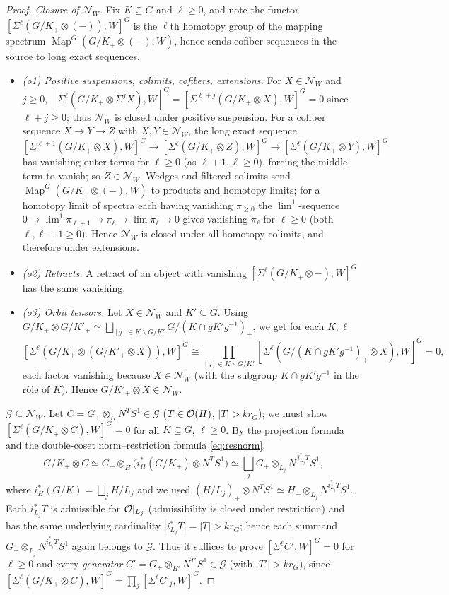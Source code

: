 \begin{proof}
\emph{Closure of $\mathcal N_W$.} Fix $K\subseteq G$ and $\ell\ge0$, and note the
functor $[\Sigma^\ell(G/K_+\otimes(-)),W]^G$ is the $\ell$th homotopy group of the
mapping spectrum $\operatorname{Map}^G(G/K_+\otimes(-),W)$, hence sends cofiber
sequences in the source to long exact sequences.
\begin{itemize}\setlength\itemsep{2pt}
\item \emph{(o1) Positive suspensions, colimits, cofibers, extensions.} For
$X\in\mathcal N_W$ and $j\ge0$, $[\Sigma^\ell(G/K_+\otimes\Sigma^jX),W]^G
=[\Sigma^{\ell+j}(G/K_+\otimes X),W]^G=0$ since $\ell+j\ge0$; thus $\mathcal N_W$
is closed under positive suspension. For a cofiber sequence $X\to Y\to Z$ with
$X,Y\in\mathcal N_W$, the long exact sequence
\[
[\Sigma^{\ell+1}(G/K_+\otimes X),W]^G\to[\Sigma^\ell(G/K_+\otimes Z),W]^G
\to[\Sigma^\ell(G/K_+\otimes Y),W]^G
\]
has vanishing outer terms for $\ell\ge0$ (as $\ell+1,\ell\ge0$), forcing the
middle term to vanish; so $Z\in\mathcal N_W$. Wedges and filtered colimits send
$\operatorname{Map}^G(G/K_+\otimes(-),W)$ to products and homotopy limits; for a
homotopy limit of spectra each having vanishing $\pi_{\ge0}$ the $\lim^1$-sequence
$0\to{\lim}^1\pi_{\ell+1}\to\pi_\ell\to\lim\pi_\ell\to0$ gives vanishing $\pi_\ell$
for $\ell\ge0$ (both $\ell,\ell+1\ge0$). Hence $\mathcal N_W$ is closed under all
homotopy colimits, and therefore under extensions.
\item \emph{(o2) Retracts.} A retract of an object with vanishing
$[\Sigma^\ell(G/K_+\otimes-),W]^G$ has the same vanishing.
\item \emph{(o3) Orbit tensors.} Let $X\in\mathcal N_W$ and $K'\subseteq G$.
Using $G/K_+\otimes G/K'_+\simeq\bigsqcup_{[g]\in K\backslash G/K'}
G/(K\cap gK'g^{-1})_+$, we get for each $K,\ell$
\[
[\Sigma^\ell(G/K_+\otimes(G/K'_+\otimes X)),W]^G
\cong\!\!\prod_{[g]\in K\backslash G/K'}\!\![\Sigma^\ell(G/(K\cap gK'g^{-1})_+\otimes X),W]^G=0,
\]
each factor vanishing because $X\in\mathcal N_W$ (with the subgroup
$K\cap gK'g^{-1}$ in the r\^ole of $K$). Hence $G/K'_+\otimes X\in\mathcal N_W$.
\end{itemize}

\emph{$\mathcal G\subseteq\mathcal N_W$.} Let $C=G_+\otimes_H N^T S^1\in\mathcal G$
($T\in\mathcal{O}(H)$, $|T|>kr_G$); we must show $[\Sigma^\ell(G/K_+\otimes C),W]^G=0$
for all $K\subseteq G$, $\ell\ge0$. By the projection formula and the
double-coset norm--restriction formula \eqref{eq:resnorm},
\[
G/K_+\otimes C\simeq G_+\otimes_H\bigl(i_H^\ast(G/K_+)\otimes N^TS^1\bigr)
\simeq\bigsqcup_{j} G_+\otimes_{L_j} N^{\,i_{L_j}^\ast T}S^1,
\]
where $i_H^\ast(G/K)=\bigsqcup_j H/L_j$ and we used $(H/L_j)_+\otimes N^TS^1
\simeq H_+\otimes_{L_j}N^{i_{L_j}^\ast T}S^1$. Each $i_{L_j}^\ast T$ is admissible
for $\mathcal{O}|_{L_j}$ (admissibility is closed under restriction) and has the same
underlying cardinality $|i_{L_j}^\ast T|=|T|>kr_G$; hence each summand
$G_+\otimes_{L_j}N^{i_{L_j}^\ast T}S^1$ again belongs to $\mathcal G$. Thus it
suffices to prove $[\Sigma^\ell C',W]^G=0$ for $\ell\ge0$ and every
\emph{generator} $C'=G_+\otimes_{H'}N^{T'}S^1\in\mathcal G$ (with $|T'|>kr_G$),
since $[\Sigma^\ell(G/K_+\otimes C),W]^G=\prod_j[\Sigma^\ell C'_j,W]^G$.


\end{proof}
